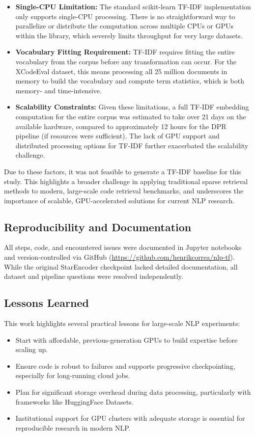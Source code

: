 \documentclass[12pt]{article}
\begin{document}
\begin{itemize}
    \item \textbf{Single-CPU Limitation:} The standard scikit-learn TF-IDF implementation only supports single-CPU processing. There is no straightforward way to parallelize or distribute the computation across multiple CPUs or GPUs within the library, which severely limits throughput for very large datasets.
    \item \textbf{Vocabulary Fitting Requirement:} TF-IDF requires fitting the entire vocabulary from the corpus before any transformation can occur. For the XCodeEval dataset, this means processing all 25 million documents in memory to build the vocabulary and compute term statistics, which is both memory- and time-intensive.
    \item \textbf{Scalability Constraints:} Given these limitations, a full TF-IDF embedding computation for the entire corpus was estimated to take over 21 days on the available hardware, compared to approximately 12 hours for the DPR pipeline (if resources were sufficient). The lack of GPU support and distributed processing options for TF-IDF further exacerbated the scalability challenge.
\end{itemize}

Due to these factors, it was not feasible to generate a TF-IDF baseline for this study. This highlights a broader challenge in applying traditional sparse retrieval methods to modern, large-scale code retrieval benchmarks, and underscores the importance of scalable, GPU-accelerated solutions for current NLP research.

\subsection{Reproducibility and Documentation}

All steps, code, and encountered issues were documented in Jupyter notebooks and version-controlled via GitHub (\url{https://github.com/henrikcorrea/nlp-tf}). While the original StarEncoder checkpoint lacked detailed documentation, all dataset and pipeline questions were resolved independently.

\subsection{Lessons Learned}

This work highlights several practical lessons for large-scale NLP experiments:
\begin{itemize}
    \item Start with affordable, previous-generation GPUs to build expertise before scaling up.
    \item Ensure code is robust to failures and supports progressive checkpointing, especially for long-running cloud jobs.
    \item Plan for significant storage overhead during data processing, particularly with frameworks like HuggingFace Datasets.
    \item Institutional support for GPU clusters with adequate storage is essential for reproducible research in modern NLP.
\end{itemize}
\end{document}
